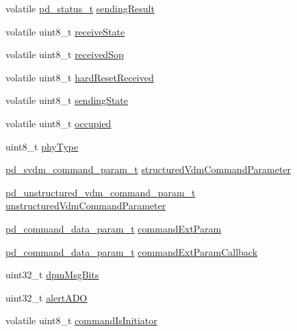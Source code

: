\begin{DoxyCompactItemize}
\item 
volatile \hyperlink{group__usb__pd__stack_ga04a1f331d9807a70ab9bb753f5ed1c80}{pd\-\_\-status\-\_\-t} \hyperlink{struct__pd__instance_ac02af68a4c0e36f39a1b3203c5638c2b}{sending\-Result}
\item 
volatile uint8\-\_\-t \hyperlink{struct__pd__instance_ac2c84f6b1ff2b7c8a1b1ac9ee358ef0e}{receive\-State}
\item 
volatile uint8\-\_\-t \hyperlink{struct__pd__instance_a21c5a4229c4d099a6840ac2d13a5a32e}{received\-Sop}
\item 
volatile uint8\-\_\-t \hyperlink{struct__pd__instance_af70b04cd5c8187c6a0424dea57205e8c}{hard\-Reset\-Received}
\item 
volatile uint8\-\_\-t \hyperlink{struct__pd__instance_ad19f652f47e237558f18b224b5d57e23}{sending\-State}
\item 
volatile uint8\-\_\-t \hyperlink{struct__pd__instance_a4649287fd50df5de2602a502655f7bb2}{occupied}
\item 
uint8\-\_\-t \hyperlink{struct__pd__instance_afae58a0b309262dc37fac1f4f92c6d7b}{phy\-Type}
\item 
\hyperlink{group__usb__pd__stack_gacedc4a601815782eff03211731ea2c7a}{pd\-\_\-svdm\-\_\-command\-\_\-param\-\_\-t} \hyperlink{struct__pd__instance_a37746abee0ebb0169f8a1e7227d8645b}{structured\-Vdm\-Command\-Parameter}
\item 
\hyperlink{group__usb__pd__stack_ga353c18d85300f7ee60dab2241f2e1310}{pd\-\_\-unstructured\-\_\-vdm\-\_\-command\-\_\-param\-\_\-t} \hyperlink{struct__pd__instance_a38406a43dd1715456b1111ad897d8120}{unstructured\-Vdm\-Command\-Parameter}
\item 
\hyperlink{group__usb__pd__stack_gac903dadc9a1dffbaac4f91f982a038de}{pd\-\_\-command\-\_\-data\-\_\-param\-\_\-t} \hyperlink{struct__pd__instance_a05d172382020769919cd2afd088fe164}{command\-Ext\-Param}
\item 
\hyperlink{group__usb__pd__stack_gac903dadc9a1dffbaac4f91f982a038de}{pd\-\_\-command\-\_\-data\-\_\-param\-\_\-t} \hyperlink{struct__pd__instance_a93988814b8f6bf439021e6ff46fff207}{command\-Ext\-Param\-Callback}
\item 
uint32\-\_\-t \hyperlink{struct__pd__instance_a6fb96c0e5c3f5f6f05f9964541078e3a}{dpm\-Msg\-Bits}
\item 
uint32\-\_\-t \hyperlink{struct__pd__instance_a483c8ee561c9edc878c4462f8b073027}{alert\-A\-D\-O}
\item 
volatile uint8\-\_\-t \hyperlink{struct__pd__instance_aece677cf125a9acd9546c1bc0f75b5b9}{command\-Is\-Initiator}

\end{DoxyCompactItemize}
